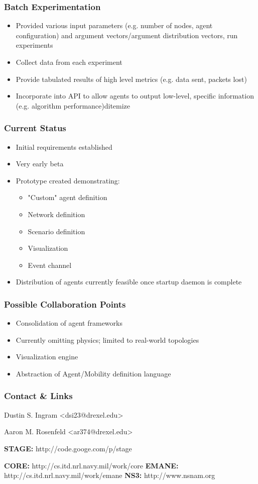\documentclass[mathserif]{beamer}
\begin{document}
\frame
{
    \frametitle{Batch Experimentation}
    \begin{itemize}
	\item Provided various input parameters (e.g. number of nodes, agent configuration) and argument vectors/argument distribution vectors, run experiments
	\item Collect data from each experiment
	\item Provide tabulated results of high level metrics (e.g. data sent, packets lost)
	\item Incorporate into API to allow agents to output low-level, specific information (e.g. algorithm performance)d{itemize}
    \end{itemize}
}

\frame
{
    \frametitle{Current Status}
    \begin{itemize}
	\item Initial requirements established
	\item Very early beta
	\item Prototype created demonstrating:
        \begin{itemize}
	    \item "Custom" agent definition
	    \item Network definition
	    \item Scenario definition
	    \item Visualization
	    \item Event channel
        \end{itemize}
    	\item Distribution of agents currently feasible once startup daemon is complete
    \end{itemize}
}

\frame
{
    \frametitle{Possible Collaboration Points}
    \begin{itemize}
	\item Consolidation of agent frameworks
	\item Currently omitting physics; limited to real-world topologies
	\item Visualization engine
	\item Abstraction of Agent/Mobility definition language
    \end{itemize}
}

\frame
{
    \frametitle{Contact \& Links}
    \begin{center}
	Dustin S. Ingram
	<dsi23@drexel.edu>

	Aaron M. Rosenfeld
	<ar374@drexel.edu>
    \end{center}
    \textbf{STAGE:} http://code.googe.com/p/stage

    \textbf{CORE:} http://cs.itd.nrl.navy.mil/work/core
    \textbf{EMANE:} http://cs.itd.nrl.navy.mil/work/emane
    \textbf{NS3:} http://www.nsnam.org 
}
\end{document}
